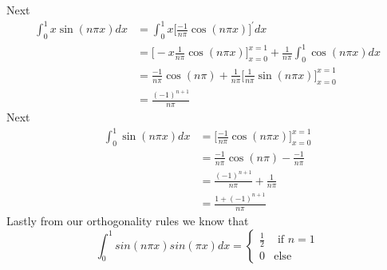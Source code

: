 \documentclass[12pt]{article}
\begin{document}
Next
\begin{align*}
	\int_{0}^{1}x \sin(n \pi x) dx & = \int_{0}^{1}x \bigg[ \frac{-1}{n \pi}\cos(n \pi x) \bigg]^{\prime}dx \\
	&= \bigg[ -x \frac{1}{n \pi}\cos(n \pi x) \bigg]_{x=0}^{x=1} + \frac{1}{n \pi} \int_{0}^{1} \cos(n \pi x) dx \\
	& = \frac{-1}{n \pi}\cos(n \pi) + \frac{1}{n \pi} \bigg[ \frac{1}{n \pi} \sin(n \pi x) \bigg]_{x=0}^{x=1} \\
	& = \frac{(-1)^{n+1}}{n\pi}
\end{align*}
Next
\begin{align*}
	\int_{0}^{1}\sin(n \pi x) dx & = \bigg[ \frac{-1}{n\pi} \cos(n \pi x) \bigg]_{x=0}^{x=1} \\
	& = \frac{-1}{n\pi} \cos(n \pi) - \frac{-1}{n\pi} \\
	& = \frac{(-1)^{n+1}}{n\pi} + \frac{1}{n\pi} \\
	& = \frac{1 + (-1)^{n+1}}{n\pi}
\end{align*}
Lastly from our orthogonality rules we know that 
$$
\int_0^1 sin(n \pi x) sin(\pi x) dx = \begin{cases}
	\frac{1}{2} & \text{ if } n=1 \\
	0 & \text{else}
\end{cases}
$$
\end{document}
